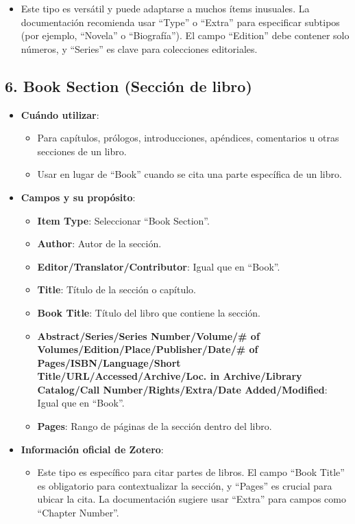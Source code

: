 \documentclass[
  jou,
  floatsintext,
  longtable,
  a4paper,
  nolmodern,
  notxfonts,
  notimes,
  colorlinks=true,linkcolor=blue,citecolor=blue,urlcolor=blue]{apa7}
\providecommand{\tightlist}{%
  \setlength{\itemsep}{0pt}\setlength{\parskip}{0pt}}
\begin{document}
\begin{itemize}
  \begin{itemize}
  \tightlist
  \item
    Este tipo es versátil y puede adaptarse a muchos ítems inusuales. La
    documentación recomienda usar ``Type'' o ``Extra'' para especificar
    subtipos (por ejemplo, ``Novela'' o ``Biografía''). El campo
    ``Edition'' debe contener solo números, y ``Series'' es clave para
    colecciones editoriales.
  \end{itemize}
\end{itemize}

\subsection{6. Book Section (Sección de
libro)}\label{book-section-secciuxf3n-de-libro}

\begin{itemize}
\tightlist
\item
  \textbf{Cuándo utilizar}:

  \begin{itemize}
  \tightlist
  \item
    Para capítulos, prólogos, introducciones, apéndices, comentarios u
    otras secciones de un libro.
  \item
    Usar en lugar de ``Book'' cuando se cita una parte específica de un
    libro.
  \end{itemize}
\item
  \textbf{Campos y su propósito}:

  \begin{itemize}
  \tightlist
  \item
    \textbf{Item Type}: Seleccionar ``Book Section''.
  \item
    \textbf{Author}: Autor de la sección.
  \item
    \textbf{Editor/Translator/Contributor}: Igual que en ``Book''.
  \item
    \textbf{Title}: Título de la sección o capítulo.
  \item
    \textbf{Book Title}: Título del libro que contiene la sección.
  \item
    \textbf{Abstract/Series/Series Number/Volume/\# of
    Volumes/Edition/Place/Publisher/Date/\# of Pages/ISBN/Language/Short
    Title/URL/Accessed/Archive/Loc. in Archive/Library Catalog/Call
    Number/Rights/Extra/Date Added/Modified}: Igual que en ``Book''.
  \item
    \textbf{Pages}: Rango de páginas de la sección dentro del libro.
  \end{itemize}
\item
  \textbf{Información oficial de Zotero}:

  \begin{itemize}
  \tightlist
  \item
    Este tipo es específico para citar partes de libros. El campo ``Book
    Title'' es obligatorio para contextualizar la sección, y ``Pages''
    es crucial para ubicar la cita. La documentación sugiere usar
    ``Extra'' para campos como ``Chapter Number''.
  \end{itemize}
\end{itemize}
\end{document}
